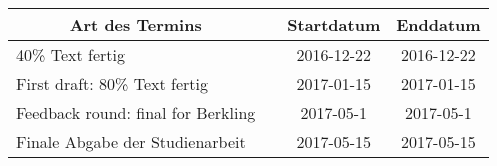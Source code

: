 \begin{tabular}{|p{6cm}|p{3.5cm}|c|c|}
\hline
\multicolumn{1}{|c|}{\textbf{Art des Termins}}               & \centering{\textbf{Teilnehmer}}                                  &              \textbf{Startdatum} & \textbf{Enddatum} \\ \hline
40\% Text fertig                                             & \centering{Marc Mahler, Marvin Zerulla}                          & 2016-12-22          & 2016-12-22        \\ \hline
First draft: 80\% Text fertig                                & \centering{Marc Mahler, Marvin Zerulla}                          & 2017-01-15          & 2017-01-15        \\ \hline
Feedback round: final for Berkling                           & \centering{Marc Mahler, Marvin Zerulla, Prof. PhD. Kay Berkling} & 2017-05-1           & 2017-05-1         \\ \hline
Finale Abgabe der Studienarbeit                              & \centering{Marc Mahler, Marvin Zerulla}                          &  2017-05-15          & 2017-05-15        \\ \hline
\end{tabular}




